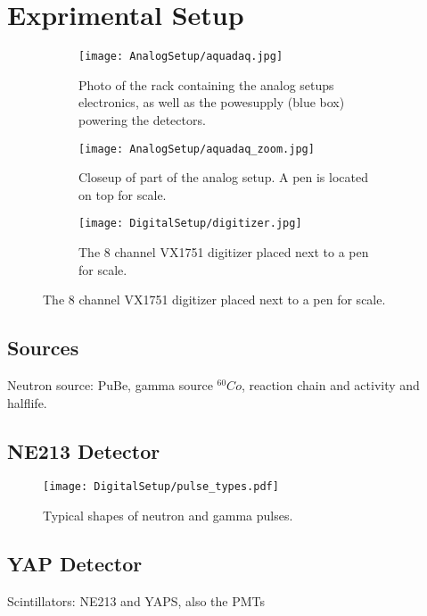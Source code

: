 \documentclass[main.tex]{subfiles}
\begin{document}
\section{Exprimental Setup}
\begin{figure}[ht]
	\begin{subfigure}[b]{0.38\textwidth}
	    \centering
			\captionsetup{width=.80\linewidth}	
    	    \texttt{[image: AnalogSetup/aquadaq.jpg]}
        	\caption{Photo of the rack containing the analog setups electronics, as well as the powesupply (blue box) powering the detectors.}
	    \label{fig:aquadaq_image} 
	\end{subfigure}
	\begin{subfigure}[b]{0.30\textwidth}
	    \centering
	    	\captionsetup{width=1\linewidth}	
    	    \texttt{[image: AnalogSetup/aquadaq\_zoom.jpg]}
        	\caption{Closeup of part of the analog setup. A pen is located on top for scale.}
	    \label{fig:aquadaq_zoom_image} 
	\end{subfigure}
	\begin{subfigure}[b]{0.3\textwidth}
    	\centering
			\captionsetup{width=.6\linewidth}	
        	\texttt{[image: DigitalSetup/digitizer.jpg]}
        	\caption{The 8 channel VX1751 digitizer placed next to a pen for scale.}
    	\label{fig:digitizer_image} 
    \end{subfigure}
\end{figure}

\subsection{Sources}
Neutron source: PuBe, gamma source $^{60}Co$, reaction chain and activity and halflife.



\subsection{NE213 Detector}
\begin{figure}[ht]
	\centering
    	\texttt{[image: DigitalSetup/pulse\_types.pdf]}
        \caption{Typical shapes of neutron and gamma pulses.}
	    \label{fig:pulse_types} 
\end{figure}
\subsection{YAP Detector}
Scintillators: NE213 and YAPS, also the PMTs
\end{document}
